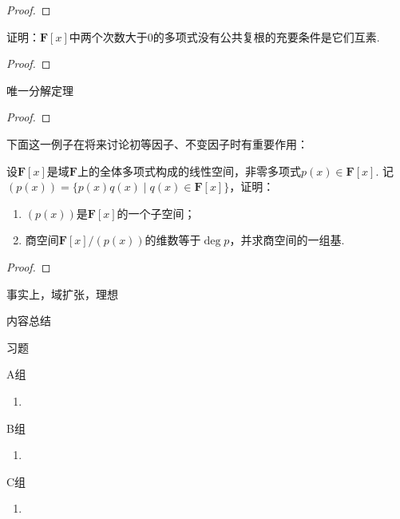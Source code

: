 \begin{proof}

\end{proof}

\begin{example}
    证明：$\mathbf{F}[x]$中两个次数大于0的多项式没有公共复根的充要条件是它们互素.
\end{example}

\begin{proof}

\end{proof}

\begin{theorem} \label{thm:14:多项式的唯一分解定理}
    唯一分解定理
\end{theorem}
\begin{proof}

\end{proof}

下面这一例子在将来讨论初等因子、不变因子时有重要作用：
\begin{example} \label{ex:14:多项式域扩张}
    设$\mathbf{F}[x]$是域$\mathbf{F}$上的全体多项式构成的线性空间，非零多项式$p(x)\in \mathbf{F}[x]$. 记$(p(x))=\{p(x)q(x)\mid q(x)\in \mathbf{F}[x]\}$，证明：
    \begin{enumerate}
        \item $(p(x))$是$\mathbf{F}[x]$的一个子空间；
        \item 商空间$\mathbf{F}[x]/(p(x))$的维数等于$\deg p$，并求商空间的一组基.
    \end{enumerate}
\end{example}
\begin{proof}

\end{proof}

事实上，域扩张，理想

\vspace{2ex}
\centerline{\heiti \Large 内容总结}

\vspace{2ex}
\centerline{\heiti \Large 习题}

\vspace{2ex}
{\kaishu }
\begin{flushright}
    \kaishu

\end{flushright}

\centerline{\heiti A组}
\begin{enumerate}
    \item
\end{enumerate}

\centerline{\heiti B组}
\begin{enumerate}
    \item
\end{enumerate}

\centerline{\heiti C组}
\begin{enumerate}
    \item
\end{enumerate}
